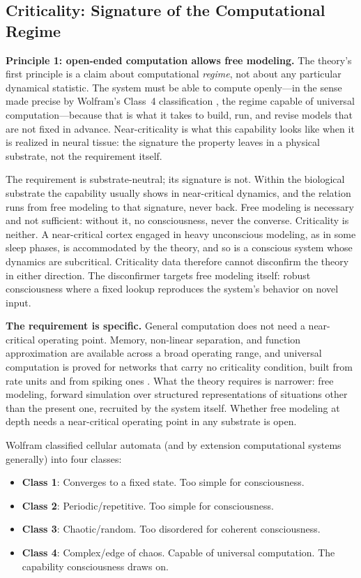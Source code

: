 \documentclass[12pt]{article}
\begin{document}
\subsection{Criticality: Signature of the Computational Regime}

\textbf{Principle 1: open-ended computation allows free modeling.} The theory's first principle is a claim about computational \emph{regime}, not about any particular dynamical statistic. The system must be able to compute openly---\hspace{0pt}in the sense made precise by Wolfram's Class~4 classification \citep{Wolfram2002}, the regime capable of universal computation---\hspace{0pt}because that is what it takes to build, run, and revise models that are not fixed in advance. Near-criticality is what this capability looks like when it is realized in neural tissue: the signature the property leaves in a physical substrate, not the requirement itself.

The requirement is substrate-neutral; its signature is not. Within the biological substrate the capability usually shows in near-critical dynamics, and the relation runs from free modeling to that signature, never back. Free modeling is necessary and not sufficient: without it, no consciousness, never the converse. Criticality is neither. A near-critical cortex engaged in heavy unconscious modeling, as in some sleep phases, is accommodated by the theory, and so is a conscious system whose dynamics are subcritical. Criticality data therefore cannot disconfirm the theory in either direction. The disconfirmer targets free modeling itself: robust consciousness where a fixed lookup reproduces the system's behavior on novel input.

\textbf{The requirement is specific.} General computation does not need a near-critical operating point. Memory, non-linear separation, and function approximation are available across a broad operating range, and universal computation is proved for networks that carry no criticality condition, built from rate units \citep{SiegelmannSontag1995} and from spiking ones \citep{Maass1996}. What the theory requires is narrower: free modeling, forward simulation over structured representations of situations other than the present one, recruited by the system itself. Whether free modeling at depth needs a near-critical operating point in any substrate is open.

Wolfram classified cellular automata (and by extension computational systems generally) into four classes:
\begin{itemize}
\item \textbf{Class 1}: Converges to a fixed state. Too simple for consciousness.
\item \textbf{Class 2}: Periodic/repetitive. Too simple for consciousness.
\item \textbf{Class 3}: Chaotic/random. Too disordered for coherent consciousness.
\item \textbf{Class 4}: Complex/edge of chaos. Capable of universal computation. The capability consciousness draws on.
\end{itemize}
\end{document}
